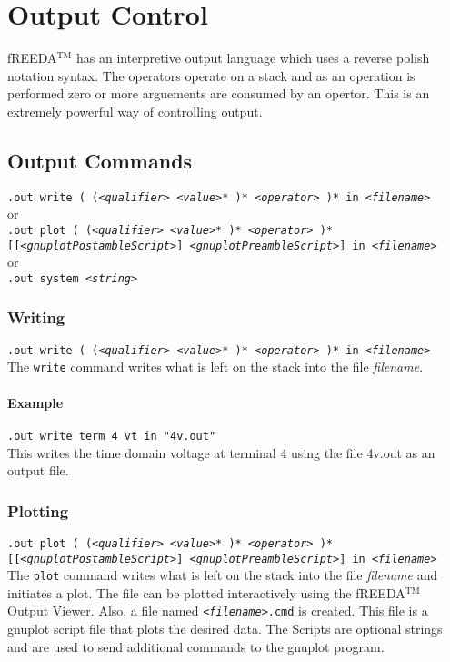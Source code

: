 
\chapter{Output Control} \label{ch_output}

fREEDA$^{\mathrm{TM}}$ has an interpretive output language which uses a reverse
polish notation syntax.  The operators operate on a stack and as an
operation is performed zero or more arguements are consumed by an
opertor.  This is an extremely powerful way of controlling output.

\section{Output Commands}

{\tt .out write
( (<{\it qualifier}> <{\it value}>* )* <{\it operator}> )*
      in <{\it filename}>} \medskip
\\
or \medskip
\\
{\tt .out plot
( (<{\it qualifier}> <{\it value}>* )* <{\it operator}> )*
[[<{\it gnuplotPostambleScript}>] <{\it gnuplotPreambleScript}>]
in <{\it filename}>} \medskip
\\
or \medskip
\\
{\tt .out system <{\it string}>}

\subsection{Writing}

{\tt .out write
( (<{\it qualifier}> <{\it value}>* )* <{\it operator}> )*
      in <{\it filename}>} \medskip
\\
The {\tt write} command writes what is left on the stack into the file
{\it filename}.

\subsubsection{Example}

{\tt .out write term 4 vt in "4v.out"} \medskip
\\
This writes the time domain voltage at terminal 4 using the file
4v.out as an output file.

\subsection{Plotting}

{\tt .out plot
( (<{\it qualifier}> <{\it value}>* )* <{\it operator}> )*
[[<{\it gnuplotPostambleScript}>] <{\it gnuplotPreambleScript}>]
in <{\it filename}>} \medskip
\\
The {\tt plot} command writes what is left on the stack into the file
{\it filename} and initiates a plot. The file can be plotted
interactively using the fREEDA$^{\mathrm{TM}}$ Output Viewer. Also, a file named
{\tt<{\it filename}>.cmd} is created. This file is a gnuplot
\cite{gnuplot} script file that plots the desired data. The Scripts
are optional strings and are used to send additional commands to the
gnuplot program.

